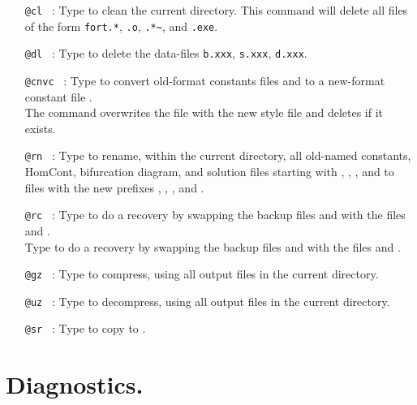 \documentclass[12pt]{report}
\begin{document}
\begin{itemize}
\item[\tt @cl]~:
  Type  
  to clean the current directory.
  This command will delete  all files of the form
  {\tt fort.*}, {\tt *.o}, {\tt *.*\~{}}, and {\tt *.exe}.

\item[\tt @dl]~:
  Type  
 to delete the data-files 
  {\tt b.xxx}, {\tt s.xxx}, {\tt d.xxx}.

\item[\tt @cnvc]~:
  Type  to convert old-format constants files
 and  to a new-format constant file
.\\
  The command  overwrites the file 
  with the new style file and deletes  if it exists.

\item[\tt @rn]~:
  Type  to rename, within the current directory, all
  old-named constants, HomCont, bifurcation
  diagram, and solution files starting with , ,
  , and  to files with the new prefixes
  , , , and .

\item[\tt @rc]~:
  Type  to do a recovery by swapping the backup files
   and  with the files
   and .\\
  Type  to do a recovery by swapping the backup files
   and  with the files
   and .

\item[\tt @gz]~:
  Type  to compress, using  all output
  files in the current directory.

\item[\tt @uz]~:
  Type  to decompress, using  all output
  files in the current directory.

\item[\tt @sr]~:
  Type  to copy  to .

\end{itemize}

\section{ Diagnostics.} 
\end{document}
